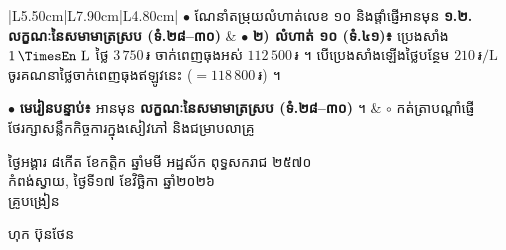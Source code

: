 \documentclass[a4paper,10pt]{article}
\newcommand{\en}[1]{{\TimesEn #1}}
\newcommand{\unit}[1]{\,\text{\en{#1}}}
\newcommand{\riel}{\,\text{៛}}
\begin{document}
\begin{longtable}{|L{5.50cm}|L{7.90cm}|L{4.80cm}|}
$\bullet$ ណែនាំតម្រុយលំហាត់លេខ ១០ និងផ្ដាំផ្ញើអានមុន \textbf{១.២. លក្ខណៈនៃសមាមាត្រស្រប (ទំ.២៨–៣០)}
&
$\bullet$ \textbf{២) លំហាត់ ១០ (ទំ.៤១)៖} ប្រេងសាំង $1\unit{L}$ ថ្លៃ $3\,750\riel$ ចាក់ពេញធុងអស់ $112\,500\riel$ ។ បើប្រេងសាំងឡើងថ្លៃបន្ថែម $210\riel/\text{L}$ ចូរគណនាថ្លៃចាក់ពេញធុងឥឡូវនេះ ($= 118\,800\riel$) ។ \par
$\bullet$ \textbf{មេរៀនបន្ទាប់៖} អានមុន \textbf{លក្ខណៈនៃសមាមាត្រស្រប (ទំ.២៨–៣០)} ។
&
$\circ$ កត់ត្រាបណ្ដាំផ្ញើ ថែរក្សាសន្លឹកកិច្ចការក្នុងសៀវភៅ និងជម្រាបលាគ្រូ \\
\end{longtable}

\vspace{8pt}
\hfill
\begin{minipage}{10.5cm}
  {\centering
    ថ្ងៃអង្គារ ៨កើត ខែកត្តិក ឆ្នាំមមី អដ្ឋស័ក ពុទ្ធសករាជ ២៥៧០\\[2pt]
    កំពង់ស្វាយ, ថ្ងៃទី១៧ ខែវិច្ឆិកា ឆ្នាំ២០២៦\\[3pt]
    {\muol គ្រូបង្រៀន}\par}
  \vspace{30pt}
  \hfill{\muol ហុក ប៊ុនថែន}\hspace*{1.4cm}
\end{minipage}
\end{document}
